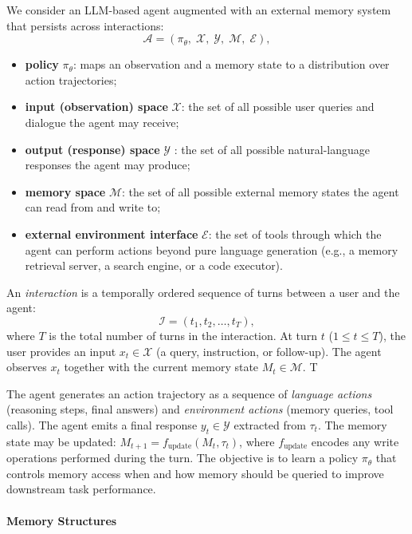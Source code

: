 \documentclass{article}
\theoremstyle{definition}
\begin{document}
We consider an LLM-based agent augmented with an external memory system that persists across interactions:
\begin{equation}
\mathcal{A} = (\pi_\theta,\; \mathcal{X},\; \mathcal{Y},\; \mathcal{M},\; \mathcal{E}),
\end{equation}
\begin{itemize}[nosep]
    \item \textbf{policy} $\pi_\theta$: maps an observation and a memory state to a distribution over action trajectories;
    \item \textbf{input (observation) space}  $\mathcal{X}$: the set of all possible user queries and dialogue the agent may receive;
    \item \textbf{output (response) space} $\mathcal{Y}$ : the set of all possible natural-language responses the agent may produce;
    \item  \textbf{memory space} $\mathcal{M}$: the set of all possible external memory states the agent can read from and write to;
    \item \textbf{external environment interface} $\mathcal{E}$: the set of tools through which the agent can perform actions beyond pure language generation (e.g., a memory retrieval server, a search engine, or a code executor).
\end{itemize}


An \emph{interaction} is a temporally ordered sequence of turns between a user and the agent:
\begin{equation}
\mathcal{I} = (t_1, t_2, \ldots, t_T),
\end{equation}
where $T$ is the total number of turns in the interaction.
At turn $t$ ($1 \le t \le T$), the user provides an input $x_t \in \mathcal{X}$ (a query, instruction, or follow-up). The agent observes $x_t$ together with the current memory state $M_t \in \mathcal{M}$. T

The agent generates an action trajectory as a sequence of \emph{language actions} (reasoning steps, final answers) and \emph{environment actions} (memory queries, tool calls).
The agent emits a final response $y_t \in \mathcal{Y}$ extracted from $\tau_t$. The memory state may be updated: $M_{t+1} = f_{\text{update}}(M_t, \tau_t)$, where $f_{\text{update}}$ encodes any write operations performed during the turn.
The objective is to learn a policy $\pi_\theta$ that controls memory access when and how memory should be queried to improve downstream task performance. 

\paragraph{Memory Structures}
\end{document}
